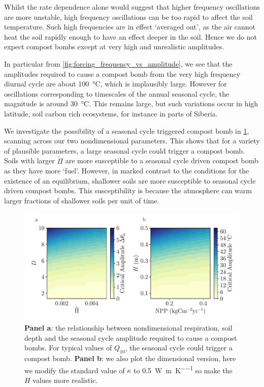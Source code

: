 Whilst the rate dependence alone would suggest that higher frequency oscillations are more unstable,
high frequency oscillations can be too rapid to affect the soil temperature. Such high frequencies are in effect `averaged out', as the air cannot heat the soil rapidly enough to
have an effect deeper in the soil. Hence we do not expect compost bombs except at very high and unrealistic amplitudes.

In particular from \cref{fig:forcing_frequency_vs_amplitude}, we see that
the amplitudes required to cause a compost bomb from the very high frequency diurnal cycle are about \SI{100}{\degreeCelsius}, which is implausibly large.
However for oscillations corresponding to timescales of the annual seasonal cycle, the magnitude is around \SI{30}{\degreeCelsius}. This remains large,
but such variations occur in high latitude, soil carbon rich ecosystems, for instance in parts of Siberia\cite{Peixoto1992}.

We investigate the possibility of a seasonal cycle triggered compost bomb in \cref{fig:critical_amplitude_to_be_triggered_by_the_seasonal_cycle}, scanning across our two nondimensional parameters.
This shows that for a variety of plausible parameters, a large seasonal cycle could trigger a compost bomb. Soils with larger $\widetilde{\Pi}$ are more susceptible to a seasonal
cycle driven compost bomb as they have more `fuel'. However, in marked contrast to the conditions for the existence of an equilibrium, shallower soils are more susceptible to seasonal cycle driven
compost bombs. This susceptibility is because the atmosphere can warm larger fractions of shallower soils per unit of time.


\begin{figure}
  \centering
  \includegraphics[scale=0.5,keepaspectratio]{seasonal_dim_and_nondim}
  \caption[Critical seasonal cycle for a compost bomb]{\textbf{Panel a}: the relationship between nondimensional respiration, soil depth and the seasonal cycle amplitude required to cause a compost bombs.
    For typical values of $Q_{10}$, the seasonal cycle could trigger a compost bomb. \textbf{Panel b}: we also plot the dimensional version, here we modify the standard value
    of $\kappa$ to \SI{0.5}{\watt\per\meter\per\kelvin} so make the $H$ values more realistic.}
  \label{fig:critical_amplitude_to_be_triggered_by_the_seasonal_cycle}
\end{figure}

